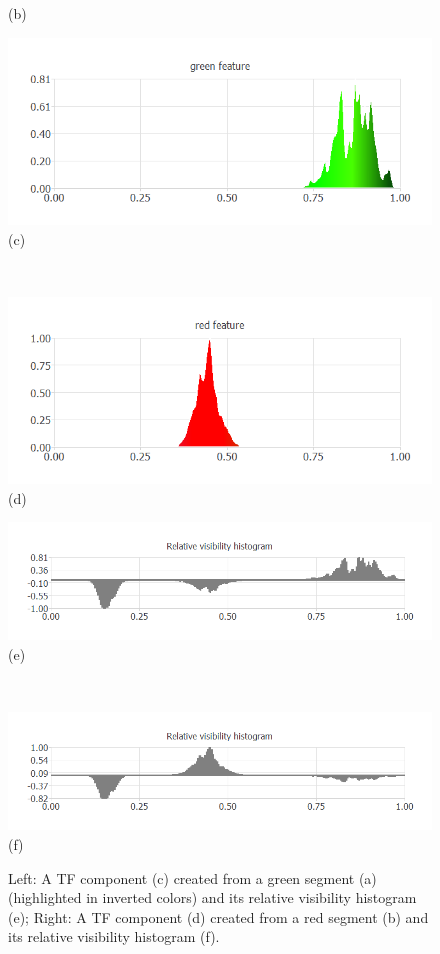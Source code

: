 \documentclass[twoside,twocolumn,10pt]{article}
\begin{document}
\begin{figure}
\begin{minipage}{.16\textwidth}
(b)
	\end{minipage}
	\begin{minipage}{.16\textwidth}
		\centering
		\includegraphics[width=1\linewidth]{nucleon_green_segment}
(c)
	\end{minipage}~
	\begin{minipage}{.16\textwidth}
		\centering
		\includegraphics[width=1\linewidth]{nucleon_red_segment}
(d)
	\end{minipage}
	\begin{minipage}{.16\textwidth}
		\centering
		\includegraphics[width=1\linewidth]{nucleon_green_segment_Relative_visibility_histogram}
(e)
	\end{minipage}~
	\begin{minipage}{.16\textwidth}
		\centering
		\includegraphics[width=1\linewidth]{nucleon_red_segment_Relative_visibility_histogram}
(f)
	\end{minipage}
	\caption{Left: A TF component (c) created from a green segment (a) (highlighted in inverted colors) and its relative visibility histogram (e); Right: A TF component (d) created from a red segment (b) and its relative visibility histogram (f).}
	\label{fig:nucleon_segments}
\end{figure}
\end{document}
